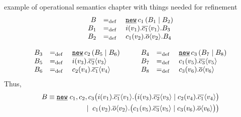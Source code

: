 \begin{old}{example of operational semantics chapter with things needed for refinement}
\begin{align*}
  \begin{array}{rcl}
     B   &\define{}&\procres[()]{c_1}{\procpar{B_1}{B_2}} \\
     B_1 &\define{}&\inp{i}{v_1}.\out{c_1}{v_1}.B_3 \\
     B_2 &\define{}&\inp{c_1}{v_2}.\out{o}{v_2}.B_4 
  \end{array}
\end{align*}

\begin{equation*}	
	\begin{aligned}	
  \begin{array}{rcl}
     B_3 &\define{}&\procres[()]{c_2}{\procpar{B_5}{B_6}} \\
     B_5 &\define{}&\inp{i}{v_3}.\out{c_2}{v_3} \\
     B_6 &\define{}&\inp{c_2}{v_4}.\out{c_1}{v_4} 
  \end{array}
\end{aligned}\quad\quad
\begin{aligned}
  \begin{array}{rcl}
     B_4   &\define{}&\procres[()]{c_3}{\procpar{B_7}{B_8}} \\
     B_7 &\define{}&\inp{c_1}{v_5}.\out{c_3}{v_5} \\
     B_8 &\define{}&\inp{c_3}{v_6}.\out{o}{v_6} 
  \end{array}
\end{aligned}
\end{equation*}
Thus, 
\begin{align*}
B\struc\procres{}{}\;c_1,c_2,c_3\bigl(\inp{i}{v_1}.\out{c_1}{v_1}.\bigl(\procpar{\inp{i}{v_3}.\out{c_2}{v_3} }{\inp{c_2}{v_4}.\out{c_1}{v_4}}\bigr) \\
\;\mid\; \inp{c_1}{v_2}.\out{o}{v_2}.\bigl(\procpar{\inp{c_1}{v_5}.\out{c_3}{v_5}}{\inp{c_3}{v_6}.\out{o}{v_6}}\bigr)\bigr)
\end{align*}


\end{old}
